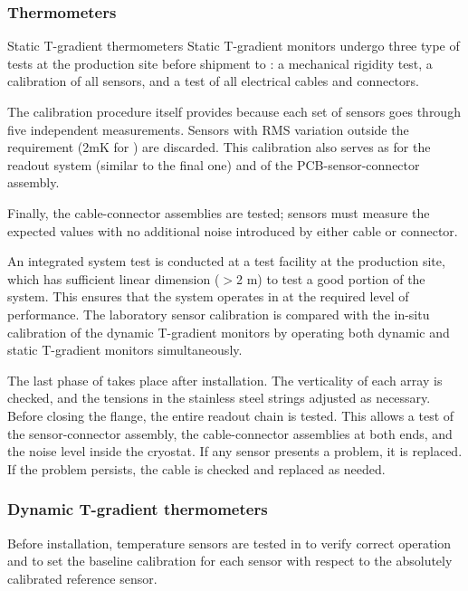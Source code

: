 \subsubsection{Thermometers}

Static T-gradient thermometers Static T-gradient monitors undergo
three type of tests at the production site before shipment to
: a mechanical rigidity test, a calibration of all
sensors, and a test of all electrical cables and connectors.

The calibration procedure itself provides  because each set
of sensors goes through five independent measurements. Sensors with
RMS variation outside the requirement (2mK for ) are
discarded. This calibration also serves as  for the readout
system (similar to the final one) and of the PCB-sensor-connector
assembly.

Finally, the cable-connector assemblies are tested; sensors must
measure the expected values with no additional noise introduced by
either cable or connector.

An integrated system test is conducted at a  test facility
at the production site, which has sufficient linear dimension ($>$2 m)
to test a good portion of the system. This ensures that the system
operates in  at the required level of performance. The
laboratory sensor calibration is compared with the in-situ calibration
of the dynamic T-gradient monitors by operating both dynamic and
static T-gradient monitors simultaneously.

The last phase of  takes place after installation. The
verticality of each array is checked, and the tensions in the
stainless steel strings adjusted as necessary. Before closing the
flange, the entire readout chain is tested. This allows a test of the
sensor-connector assembly, the cable-connector assemblies at both
ends, and the noise level inside the cryostat. If any sensor presents
a problem, it is replaced. If the problem persists, the cable is
checked and replaced as needed.

\subsubsection{Dynamic T-gradient thermometers}

Before installation, temperature sensors are tested in  to
verify correct operation and to set the baseline calibration for each
sensor with respect to the absolutely calibrated reference sensor.

